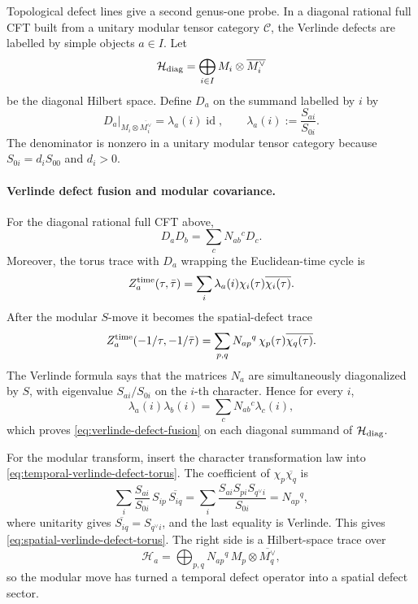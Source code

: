 Topological defect lines give a second genus-one probe.  In a diagonal
rational full CFT built from a unitary modular tensor category
\(\mathcal C\), the Verlinde defects are labelled by simple objects
\(a\in I\).  Let
\[
  \mathcal H_{\rm diag}
  =
  \bigoplus_{i\in I}M_i\otimes \overline{M_i^\vee}
\]
be the diagonal Hilbert space.  Define \(D_a\) on the summand labelled by
\(i\) by
\begin{equation}
  D_a\big|_{M_i\otimes \overline{M_i^\vee}}
  =
  \lambda_a(i)\operatorname{id},
  \qquad
  \lambda_a(i):=\frac{S_{ai}}{S_{0i}} .
  \label{eq:verlinde-defect-eigenvalue}
\end{equation}
The denominator is nonzero in a unitary modular tensor category because
\(S_{0i}=d_i S_{00}\) and \(d_i>0\).

\paragraph{Verlinde defect fusion and modular covariance.}
For the diagonal rational full CFT above,
\begin{equation}
  D_aD_b=\sum_c N_{ab}{}^cD_c .
  \label{eq:verlinde-defect-fusion}
\end{equation}
Moreover, the torus trace with \(D_a\) wrapping the Euclidean-time cycle is
\begin{equation}
  Z_a^{\rm time}(\tau,\bar\tau)
  =
  \sum_i \lambda_a(i)\chi_i(\tau)\overline{\chi_i(\tau)} .
  \label{eq:temporal-verlinde-defect-torus}
\end{equation}
After the modular \(S\)-move it becomes the spatial-defect trace
\begin{equation}
  Z_a^{\rm time}(-1/\tau,-1/\bar\tau)
  =
  \sum_{p,q}N_{ap}{}^q\,\chi_p(\tau)\overline{\chi_q(\tau)} .
  \label{eq:spatial-verlinde-defect-torus}
\end{equation}
The Verlinde formula says that the matrices \(N_a\) are simultaneously
diagonalized by \(S\), with eigenvalue \(S_{ai}/S_{0i}\) on the \(i\)-th
character.  Hence for every \(i\),
\[
  \lambda_a(i)\lambda_b(i)
  =
  \sum_c N_{ab}{}^c\lambda_c(i),
\]
which proves \eqref{eq:verlinde-defect-fusion} on each diagonal summand of
\(\mathcal H_{\rm diag}\).

For the modular transform, insert the character transformation law into
\eqref{eq:temporal-verlinde-defect-torus}.  The coefficient of
\(\chi_p\overline{\chi_q}\) is
\[
  \sum_i
  \frac{S_{ai}}{S_{0i}}\,S_{ip}\,\overline{S_{iq}}
  =
  \sum_i
  \frac{S_{ai}S_{pi}S_{q^\vee i}}{S_{0i}}
  =
  N_{ap}{}^q,
\]
where unitarity gives \(\overline{S_{iq}}=S_{q^\vee i}\), and the last
equality is Verlinde.  This gives
\eqref{eq:spatial-verlinde-defect-torus}.  The right side is a Hilbert-space
trace over
\[
  \mathcal H_a
  =
  \bigoplus_{p,q}N_{ap}{}^q\,
  M_p\otimes\overline{M_q^\vee},
\]
so the modular move has turned a temporal defect operator into a spatial
defect sector.

